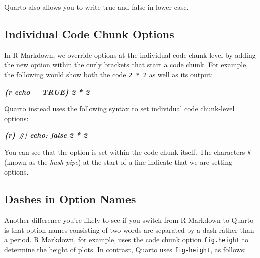 \documentclass[
]{book}
\newenvironment{Shaded}{\begin{snugshade}}{\end{snugshade}}
\newcommand{\InformationTok}[1]{\textcolor[rgb]{0.56,0.35,0.01}{\textbf{\textit{#1}}}}
\begin{document}
Quarto also allows you to write true and false in lower case.

\hypertarget{individual-code-chunk-options}{%
\subsection*{Individual Code Chunk Options}\label{individual-code-chunk-options}}

In R Markdown, we override options at the individual code chunk level by adding the new option within the curly brackets that start a code chunk. For example, the following would show both the code \texttt{2\ *\ 2} as well as its output:

\begin{Shaded}
\begin{Highlighting}[]
\InformationTok{\textasciigrave{}\textasciigrave{}\textasciigrave{}\{r echo = TRUE\}}
\InformationTok{2 * 2}
\InformationTok{\textasciigrave{}\textasciigrave{}\textasciigrave{}}
\end{Highlighting}
\end{Shaded}

Quarto instead uses the following syntax to set individual code chunk-level options:

\begin{Shaded}
\begin{Highlighting}[]
\InformationTok{\textasciigrave{}\textasciigrave{}\textasciigrave{}\{r\}}
\InformationTok{\#| echo: false}
\InformationTok{2 * 2}
\InformationTok{\textasciigrave{}\textasciigrave{}\textasciigrave{}}
\end{Highlighting}
\end{Shaded}

You can see that the option is set within the code chunk itself. The characters \texttt{\#\textbar{}} (known as the \emph{hash pipe}) at the start of a line indicate that we are setting options.

\hypertarget{dashes-in-option-names}{%
\subsection*{Dashes in Option Names}\label{dashes-in-option-names}}

Another difference you're likely to see if you switch from R Markdown to Quarto is that option names consisting of two words are separated by a dash rather than a period. R Markdown, for example, uses the code chunk option \texttt{fig.height} to determine the height of plots. In contrast, Quarto uses \texttt{fig-height}, as follows:
\end{document}
